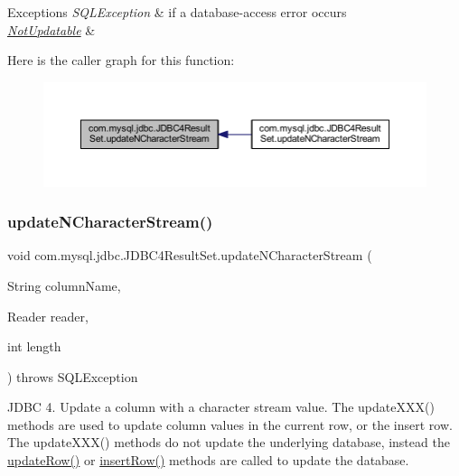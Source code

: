 \begin{DoxyExceptions}{Exceptions}
{\em S\+Q\+L\+Exception} & if a database-\/access error occurs \\
\hline
{\em \mbox{\hyperlink{classcom_1_1mysql_1_1jdbc_1_1_not_updatable}{Not\+Updatable}}} & \\
\hline
\end{DoxyExceptions}
Here is the caller graph for this function\+:
\nopagebreak
\begin{figure}[H]
\begin{center}
\leavevmode
\includegraphics[width=350pt]{classcom_1_1mysql_1_1jdbc_1_1_j_d_b_c4_result_set_a5d72c53312683748786c1416e5e14bf5_icgraph}
\end{center}
\end{figure}
\mbox{\label{classcom_1_1mysql_1_1jdbc_1_1_j_d_b_c4_result_set_a641a93c720890dce9260033269fa9611}} 
\subsubsection{\texorpdfstring{update\+N\+Character\+Stream()}{updateNCharacterStream()}\hspace{0.1cm}{\footnotesize\ttfamily [2/2]}}
{\footnotesize\ttfamily void com.\+mysql.\+jdbc.\+J\+D\+B\+C4\+Result\+Set.\+update\+N\+Character\+Stream (\begin{DoxyParamCaption}\item[{String}]{column\+Name,  }\item[{Reader}]{reader,  }\item[{int}]{length }\end{DoxyParamCaption}) throws S\+Q\+L\+Exception}

J\+D\+BC 4. Update a column with a character stream value. The update\+X\+X\+X() methods are used to update column values in the current row, or the insert row. The update\+X\+X\+X() methods do not update the underlying database, instead the \mbox{\hyperlink{classcom_1_1mysql_1_1jdbc_1_1_result_set_impl_a2842d32292d023aaeeafedeed3322981}{update\+Row()}} or \mbox{\hyperlink{classcom_1_1mysql_1_1jdbc_1_1_result_set_impl_a78e304e3279cbcf60392f18c1385e3bf}{insert\+Row()}} methods are called to update the database.


